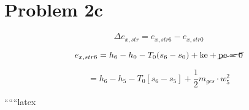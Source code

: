 \section*{Problem 2c}

\[
\Delta e_{x,str} = e_{x,str6} - e_{x,str0}
\]

\[
e_{x,str6} = h_6 - h_0 - T_0 (s_6 - s_0) + \text{ke} + \cancel{\text{pe}=0}
\]

\[
= h_6 - h_5 - T_0 [s_6 - s_5] + \frac{1}{2} m_{ges} \cdot w_5^2
\]

``````latex